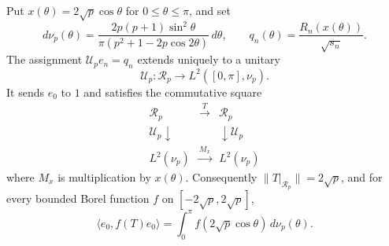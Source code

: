 \begin{theorem}
\label{v4-arith:radial:transform}
Put $x(\theta)=2\sqrt p\cos\theta$ for $0\le\theta\le\pi$, and set
\[
 d\nu_p(\theta)=\frac{2p(p+1)\sin^2\theta}
 {\pi(p^2+1-2p\cos2\theta)}\,d\theta,\qquad
 q_n(\theta)=\frac{R_n(x(\theta))}{\sqrt{s_n}}.
\]
The assignment $\mathcal U_pe_n=q_n$ extends uniquely to a unitary
\[
 \mathcal U_p:\mathcal R_p\longrightarrow L^2([0,\pi],\nu_p).
\]
It sends $e_0$ to $1$ and satisfies the commutative square
\[
 \begin{array}{ccc}
 \mathcal R_p &\xrightarrow{T}& \mathcal R_p\\
 \mathcal U_p\downarrow &&\downarrow\mathcal U_p\\
 L^2(\nu_p)&\xrightarrow{M_x}&L^2(\nu_p)
 \end{array}
\]
where $M_x$ is multiplication by $x(\theta)$.
Consequently $\|T|_{\mathcal R_p}\|=2\sqrt p$, and for every bounded
Borel function $f$ on $[-2\sqrt p,2\sqrt p]$,
\[
 \langle e_0,f(T)e_0\rangle
 =\int_0^\pi f(2\sqrt p\cos\theta)\,d\nu_p(\theta).
 \label{v4-arith:radial:state}
\]
\end{theorem}

